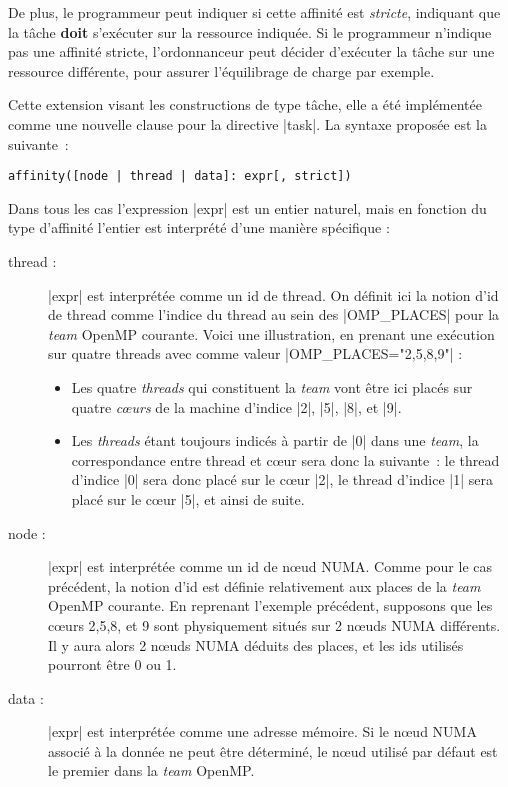 De plus, le programmeur peut indiquer si cette affinité est \emph{stricte}, indiquant que la tâche \textbf{doit} s'exécuter sur la ressource indiquée.
Si le programmeur n'indique pas une affinité stricte, l'ordonnanceur peut décider d'exécuter la tâche sur une ressource différente, pour assurer l'équilibrage de charge par exemple.

Cette extension visant les constructions de type tâche, elle a été implémentée comme une nouvelle clause pour la directive |task|. La syntaxe proposée est la suivante~:

\begin{lstlisting}
affinity([node | thread | data]: expr[, strict])
\end{lstlisting}

Dans tous les cas l'expression |expr| est un entier naturel, mais en fonction du type d'affinité l'entier est interprété d'une manière spécifique :

\begin{description}
  \item [thread :]
    |expr| est interprétée comme un id de thread. On définit ici la notion d'id de thread comme l'indice du thread au sein des |OMP_PLACES| pour la \textit{team} OpenMP courante.
    Voici une illustration, en prenant une exécution sur quatre threads avec comme valeur |OMP_PLACES="{2},{5},{8},{9}"| :
    \begin{itemize}
      \item Les quatre \emph{threads} qui constituent la \emph{team} vont être ici placés sur quatre \emph{cœurs} de la machine d'indice |2|, |5|, |8|, et |9|.
      \item Les \emph{threads} étant toujours indicés à partir de |0| dans une \emph{team}, la correspondance entre thread et cœur sera donc la suivante~: le thread d'indice |0| sera donc placé sur le cœur |2|, le thread d'indice |1| sera placé sur le cœur |5|, et ainsi de suite.
    \end{itemize}
  \item [node :]
    |expr| est interprétée comme un id de nœud NUMA. Comme pour le cas précédent, la notion d'id est définie relativement aux places de la \textit{team} OpenMP courante.
    En reprenant l'exemple précédent, supposons que les cœurs 2,5,8, et 9 sont physiquement situés sur 2 nœuds NUMA différents. Il y aura alors 2 nœuds NUMA déduits des places, et les ids utilisés pourront être 0 ou 1.
  \item [data :]
    |expr| est interprétée comme une adresse mémoire. Si le nœud NUMA associé à la donnée ne peut être déterminé, le nœud utilisé par défaut est le premier dans la \textit{team} OpenMP.
\end{description}

